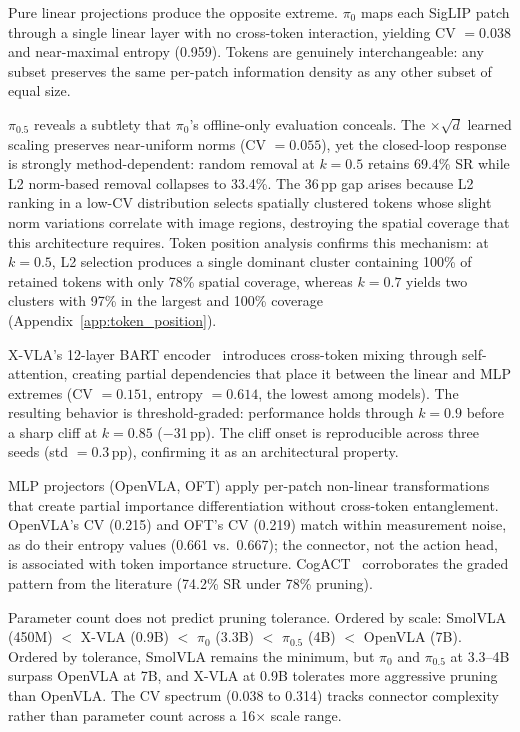 Pure linear projections produce the opposite extreme. $\pi_{0}$ maps each SigLIP patch through a single linear layer with no cross-token interaction, yielding CV $= 0.038$ and near-maximal entropy (0.959). Tokens are genuinely interchangeable: any subset preserves the same per-patch information density as any other subset of equal size.

$\pi_{0.5}$ reveals a subtlety that $\pi_{0}$'s offline-only evaluation conceals. The $\times\!\sqrt{d}$ learned scaling preserves near-uniform norms (CV $= 0.055$), yet the closed-loop response is strongly method-dependent: random removal at $k{=}0.5$ retains 69.4\% SR while L2 norm-based removal collapses to 33.4\%. The 36\,pp gap arises because L2 ranking in a low-CV distribution selects spatially clustered tokens whose slight norm variations correlate with image regions, destroying the spatial coverage that this architecture requires. Token position analysis confirms this mechanism: at $k{=}0.5$, L2 selection produces a single dominant cluster containing 100\% of retained tokens with only 78\% spatial coverage, whereas $k{=}0.7$ yields two clusters with 97\% in the largest and 100\% coverage (Appendix~\ref{app:token_position}).

X-VLA's 12-layer BART encoder~\cite{lewis2020bart} introduces cross-token mixing through self-attention, creating partial dependencies that place it between the linear and MLP extremes (CV $= 0.151$, entropy $= 0.614$, the lowest among models). The resulting behavior is threshold-graded: performance holds through $k{=}0.9$ before a sharp cliff at $k{=}0.85$ ($-$31\,pp). The cliff onset is reproducible across three seeds (std $= 0.3$\,pp), confirming it as an architectural property.

MLP projectors (OpenVLA, OFT) apply per-patch non-linear transformations that create partial importance differentiation without cross-token entanglement. OpenVLA's CV (0.215) and OFT's CV (0.219) match within measurement noise, as do their entropy values (0.661 vs.\ 0.667); the connector, not the action head, is associated with token importance structure. CogACT~\cite{li2024cogact} corroborates the graded pattern from the literature (74.2\% SR under 78\% pruning).

Parameter count does not predict pruning tolerance. Ordered by scale: SmolVLA (450M) $<$ X-VLA (0.9B) $<$ $\pi_{0}$ (3.3B) $<$ $\pi_{0.5}$ (4B) $<$ OpenVLA (7B). Ordered by tolerance, SmolVLA remains the minimum, but $\pi_{0}$ and $\pi_{0.5}$ at 3.3--4B surpass OpenVLA at 7B, and X-VLA at 0.9B tolerates more aggressive pruning than OpenVLA. The CV spectrum (0.038 to 0.314) tracks connector complexity rather than parameter count across a 16$\times$ scale range.


